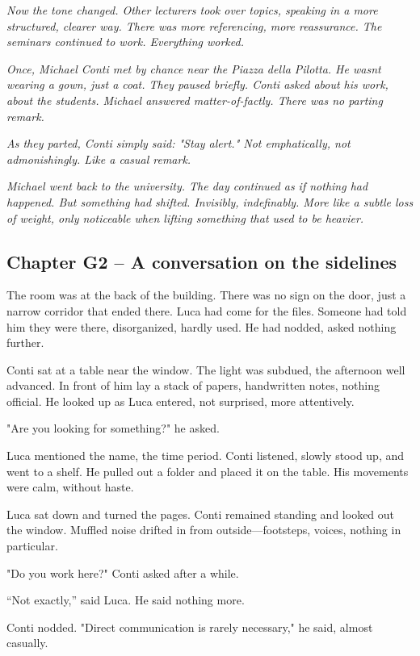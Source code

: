 \documentclass[
]{article}
\begin{document}
\emph{Now the tone changed. Other lecturers took over topics, speaking in a more structured, clearer way. There was more referencing, more reassurance. The seminars continued to work. Everything worked.}

\emph{Once, Michael Conti met by chance near the Piazza della Pilotta. He wasn\textquotesingle t wearing a gown, just a coat. They paused briefly. Conti asked about his work, about the students. Michael answered matter-of-factly. There was no parting remark.}

\emph{As they parted, Conti simply said: "Stay alert." Not emphatically, not admonishingly. Like a casual remark.}

\emph{Michael went back to the university. The day continued as if nothing had happened. But something had shifted. Invisibly, indefinably. More like a subtle loss of weight, only noticeable when lifting something that used to be heavier.}

\subsection{Chapter G2 -- A conversation on the sidelines}\label{chapter-g2-a-conversation-on-the-sidelines}

The room was at the back of the building. There was no sign on the door, just a narrow corridor that ended there. Luca had come for the files. Someone had told him they were there, disorganized, hardly used. He had nodded, asked nothing further.

Conti sat at a table near the window. The light was subdued, the afternoon well advanced. In front of him lay a stack of papers, handwritten notes, nothing official. He looked up as Luca entered, not surprised, more attentively.

"Are you looking for something?" he asked.

Luca mentioned the name, the time period. Conti listened, slowly stood up, and went to a shelf. He pulled out a folder and placed it on the table. His movements were calm, without haste.

Luca sat down and turned the pages. Conti remained standing and looked out the window. Muffled noise drifted in from outside---footsteps, voices, nothing in particular.

"Do you work here?" Conti asked after a while.

``Not exactly,'' said Luca. He said nothing more.

Conti nodded. "Direct communication is rarely necessary," he said, almost casually.
\end{document}
